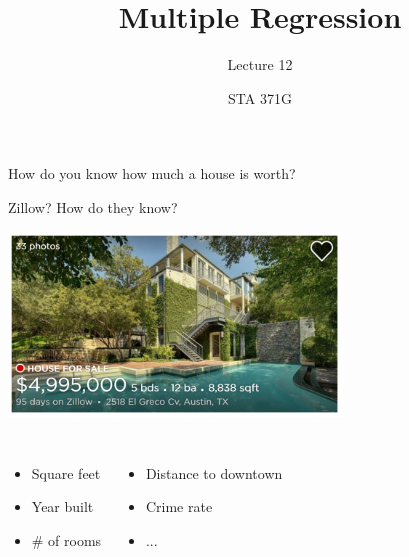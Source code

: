 \documentclass{beamer}\usepackage[]{graphicx}\usepackage[]{color}
\title{Multiple Regression}
\subtitle{Lecture 12}
\author{STA 371G}
\begin{document}
  
  
  

  \frame{\maketitle}



  \begin{darkframes}
    \begin{frame}
      How do you know how much a house is worth? \pause

      Zillow? How do they know?

      \begin{center}
        \includegraphics[width=3.5in]{zillow} \\
      \end{center} \pause

      \begin{columns}[onlytextwidth]
          \begin{itemize}
            \item Square feet
            \item Year built
            \item \# of rooms
          \end{itemize}
          \begin{itemize}
            \item Distance to downtown
            \item Crime rate
            \item ...
          \end{itemize}
      \end{columns}



\end{frame}
\end{darkframes}
\end{document}
